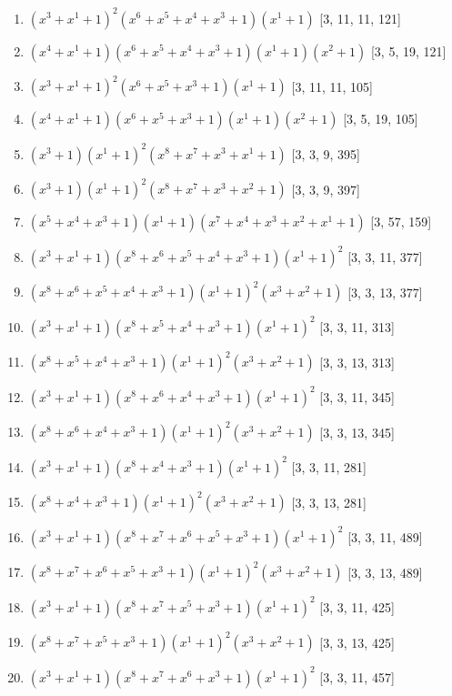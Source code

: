 \documentclass[10pt,twocolumn]{article}
\begin{document}
\begin{enumerate}
\item $(x^{3} + x^{1} + 1)^{2}(x^{6} + x^{5} + x^{4} + x^{3} + 1)(x^{1} + 1)$  [3, 11, 11, 121]
\item $(x^{4} + x^{1} + 1)(x^{6} + x^{5} + x^{4} + x^{3} + 1)(x^{1} + 1)(x^{2} + 1)$  [3, 5, 19, 121]
\item $(x^{3} + x^{1} + 1)^{2}(x^{6} + x^{5} + x^{3} + 1)(x^{1} + 1)$  [3, 11, 11, 105]
\item $(x^{4} + x^{1} + 1)(x^{6} + x^{5} + x^{3} + 1)(x^{1} + 1)(x^{2} + 1)$  [3, 5, 19, 105]
\item $(x^{3} + 1)(x^{1} + 1)^{2}(x^{8} + x^{7} + x^{3} + x^{1} + 1)$  [3, 3, 9, 395]
\item $(x^{3} + 1)(x^{1} + 1)^{2}(x^{8} + x^{7} + x^{3} + x^{2} + 1)$  [3, 3, 9, 397]
\item $(x^{5} + x^{4} + x^{3} + 1)(x^{1} + 1)(x^{7} + x^{4} + x^{3} + x^{2} + x^{1} + 1)$  [3, 57, 159]
\item $(x^{3} + x^{1} + 1)(x^{8} + x^{6} + x^{5} + x^{4} + x^{3} + 1)(x^{1} + 1)^{2}$  [3, 3, 11, 377]
\item $(x^{8} + x^{6} + x^{5} + x^{4} + x^{3} + 1)(x^{1} + 1)^{2}(x^{3} + x^{2} + 1)$  [3, 3, 13, 377]
\item $(x^{3} + x^{1} + 1)(x^{8} + x^{5} + x^{4} + x^{3} + 1)(x^{1} + 1)^{2}$  [3, 3, 11, 313]
\item $(x^{8} + x^{5} + x^{4} + x^{3} + 1)(x^{1} + 1)^{2}(x^{3} + x^{2} + 1)$  [3, 3, 13, 313]
\item $(x^{3} + x^{1} + 1)(x^{8} + x^{6} + x^{4} + x^{3} + 1)(x^{1} + 1)^{2}$  [3, 3, 11, 345]
\item $(x^{8} + x^{6} + x^{4} + x^{3} + 1)(x^{1} + 1)^{2}(x^{3} + x^{2} + 1)$  [3, 3, 13, 345]
\item $(x^{3} + x^{1} + 1)(x^{8} + x^{4} + x^{3} + 1)(x^{1} + 1)^{2}$  [3, 3, 11, 281]
\item $(x^{8} + x^{4} + x^{3} + 1)(x^{1} + 1)^{2}(x^{3} + x^{2} + 1)$  [3, 3, 13, 281]
\item $(x^{3} + x^{1} + 1)(x^{8} + x^{7} + x^{6} + x^{5} + x^{3} + 1)(x^{1} + 1)^{2}$  [3, 3, 11, 489]
\item $(x^{8} + x^{7} + x^{6} + x^{5} + x^{3} + 1)(x^{1} + 1)^{2}(x^{3} + x^{2} + 1)$  [3, 3, 13, 489]
\item $(x^{3} + x^{1} + 1)(x^{8} + x^{7} + x^{5} + x^{3} + 1)(x^{1} + 1)^{2}$  [3, 3, 11, 425]
\item $(x^{8} + x^{7} + x^{5} + x^{3} + 1)(x^{1} + 1)^{2}(x^{3} + x^{2} + 1)$  [3, 3, 13, 425]
\item $(x^{3} + x^{1} + 1)(x^{8} + x^{7} + x^{6} + x^{3} + 1)(x^{1} + 1)^{2}$  [3, 3, 11, 457]

\end{enumerate}
\end{document}
